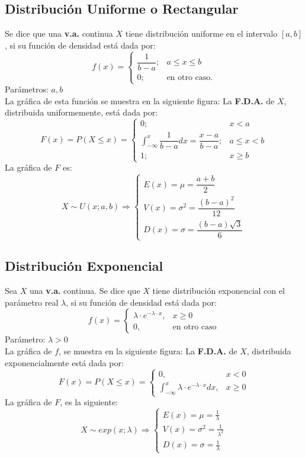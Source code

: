 \subsection{Distribución Uniforme o Rectangular}
Se dice que una \textbf{v.a.} continua $X$ tiene distribución uniforme en el intervalo $[a,b]$, si su función de densidad está dada por:
$$
f(x) = 
\begin{cases}
\dfrac{1}{b-a} ;& a\leq x \leq b \\
0 ;& \text{en otro caso.}
\end{cases}
$$
Parámetros: $a,b$ \\$ { } $\\
La gráfica de esta función se muestra en la siguiente figura:
La \textbf{F.D.A.} de $X$, distribuida uniformemente, está dada por:
$$
F(x)=P(X\leq x)=
\begin{cases}
0 ;& x<a \\
\displaystyle\int_{-\infty}^{x} \dfrac{1}{b-a} dx=\dfrac{x-a}{b-a} ;& a\leq x < b \\
1 ;& x\geq b
\end{cases}
$$ 
La gráfica de $F$ es:
$$
X \sim U(x;a,b)\Rightarrow 
\begin{cases}
E(x)=\mu = \dfrac{a+b}{2} \\
V(x)=\sigma^2 = \dfrac{(b-a)^2}{12} \\
D(x)=\sigma = \dfrac{(b-a)\sqrt{3}}{6}
\end{cases}
$$
\subsection{Distribución Exponencial}
Sea $X$ una \textbf{v.a.} continua. Se dice que $X$ tiene distribución exponencial con el parámetro real $\lambda$, si su función de densidad está dada por:
$$
f(x)=
\begin{cases}
\lambda\cdot e^{-\lambda\cdot x} ,& x\geq 0 \\
0 ,& \text{en otro caso}
\end{cases}
$$
Parámetro: $\lambda>0$ \\${ }$\\
La gráfica de $f$, se muestra en la siguiente figura:
%
La \textbf{F.D.A.} de $X$, distribuida exponencialmente está dada por:
$$
F(x)=P(X\leq x)=
\begin{cases}
0, & x<0 \\
\displaystyle\int_{-\infty}^{x} \lambda\cdot e^{-\lambda\cdot x} dx ,& x\geq 0
\end{cases}
$$
La gráfica de $F$, es la siguiente:
$$
X\sim exp(x;\lambda)\Rightarrow
\begin{cases}
E(x) = \mu = \frac{1}{\lambda} \\
V(x) = \sigma^2 = \frac{1}{\lambda^2} \\
D(x) = \sigma = \frac{1}{\lambda}
\end{cases}
$$

